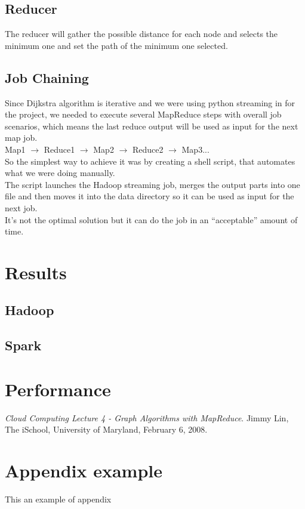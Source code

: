 \documentclass[english]{article}
\begin{document}
\newpage
\subsection{Reducer}
The reducer will gather the possible distance for each node and selects the minimum one and set the path of the minimum one selected.


\subsection{Job Chaining}
Since Dijkstra algorithm is iterative and we were using python streaming in for the project, we needed to execute several MapReduce steps with overall job scenarios, which means the last reduce output will be used as input for the next map job.\\

Map1 $\rightarrow$ Reduce1 $\rightarrow$ Map2 $\rightarrow$ Reduce2 $\rightarrow$ Map3... \\

So the simplest way to achieve it was by creating a shell script, that automates what we were doing manually.\\

The script launches the Hadoop streaming job, merges the output parts into one file and then moves it into the data directory so it can be used as input for the next job.\\

It’s not the optimal solution but it can do the job in an “acceptable” amount of time.\\

\section{Results}

\subsection{Hadoop}

\subsection{Spark}

\section{Performance}

\newpage

\begin{thebibliography}{9}
 \textit{Cloud Computing Lecture 4 - Graph Algorithms with MapReduce}. Jimmy Lin, The iSchool, University of Maryland, February 6, 2008.
\end{thebibliography}
\newpage
\appendix
\section{Appendix example}
This an example of appendix
\end{document}
